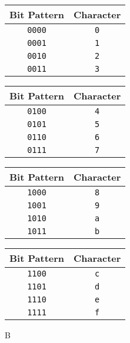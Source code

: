 \documentclass[10pt,letterpaper]{scrartcl}
\begin{document}
\begin{table}[!ht]
    \parbox{.5\linewidth}{
        \begin{tabular}{|c|c|}
            \hline 
            Bit Pattern & Character \\ \hline\hline 
            \texttt{0000} & \texttt{0} \\ \hline 
            \texttt{0001} & \texttt{1} \\ \hline 
            \texttt{0010} & \texttt{2} \\ \hline 
            \texttt{0011} & \texttt{3} \\ \hline 
        \end{tabular}
    }
    \hfill\parbox{.5\linewidth}{
        \begin{tabular}{| c | c |}
            \hline 
            Bit Pattern & Character \\ \hline\hline 
            \texttt{0100} & \texttt{4} \\ \hline 
            \texttt{0101} & \texttt{5} \\ \hline 
            \texttt{0110} & \texttt{6} \\ \hline 
            \texttt{0111} & \texttt{7} \\ \hline 
        \end{tabular}
    }
    \hfill\parbox{.5\linewidth}{
        \begin{tabular}{| c | c |}
            \hline
            Bit Pattern & Character \\ \hline\hline 
            \texttt{1000} & \texttt{8} \\ \hline 
            \texttt{1001} & \texttt{9} \\ \hline 
            \texttt{1010} & \texttt{a} \\ \hline 
            \texttt{1011} & \texttt{b} \\ \hline 
        \end{tabular}
    }
    \hfill\parbox{.5\linewidth}{
        \begin{tabular}{| c | c |}
            \hline
            Bit Pattern & Character \\ \hline\hline 
            \texttt{1100} & \texttt{c} \\ \hline 
            \texttt{1101} & \texttt{d} \\ \hline 
            \texttt{1110} & \texttt{e} \\ \hline 
            \texttt{1111} & \texttt{f} \\ \hline 
        \end{tabular}
    }
\end{table}
B
\end{document}
